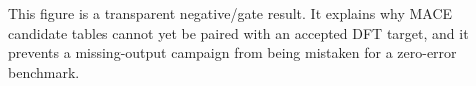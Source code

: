 This figure is a transparent negative/gate result. It explains why MACE candidate tables cannot yet be paired with an accepted DFT target, and it prevents a missing-output campaign from being mistaken for a zero-error benchmark.
